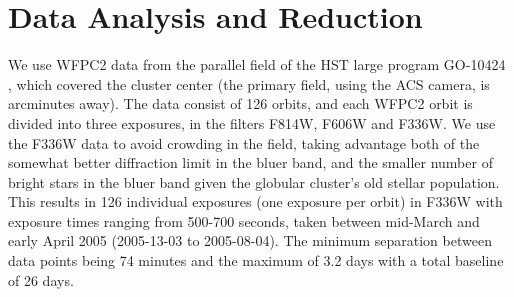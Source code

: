 \documentclass[fleqn,usenatbib,useAMS,letters]{mnras}
\begin{document}
\section{Data Analysis and Reduction}


We use WFPC2 data from the parallel field of the HST large program %
GO-10424 \citep{2006Sci...313..936R}, which covered the cluster center (the primary field, using the ACS camera, is arcminutes away). The data consist of 126 orbits, and each WFPC2 orbit is divided into three exposures, in the filters F814W, F606W and F336W.
We use the F336W data to avoid crowding in the field, taking advantage both of the somewhat better diffraction limit in the bluer band, and the smaller number of bright stars in the bluer band given the globular cluster's old stellar population. This results in 126 individual exposures (one exposure per orbit) in F336W with exposure times ranging from 500-700 seconds, taken between mid-March and early April 2005 (2005-13-03 to 2005-08-04). The minimum separation between data points being 74 minutes and the maximum of 3.2 days with a total baseline of 26 days.
\end{document}
